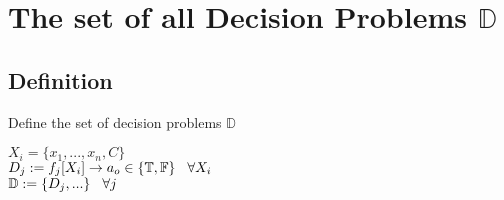 \documentclass[11pt]{article}
\begin{document}
\section{The set of all Decision Problems $\mathbb{D}$}

\subsection{Definition}
Define the set of decision problems $\mathbb{D}$
\begin{center}
$
X_i = \{x_1,...,x_n,C\}
$
\\ \vspace{2mm}
$
D_j := f_j \lbrack X_i \rbrack \rightarrow a_{o} \in \{\mathbb{T}, \mathbb{F}\} \hspace{3mm} \forall X_i
$
\\ \vspace{2mm}
$\mathbb{D} := \{D_j,...\} \hspace{3mm} \forall j$
\end{center}






\end{document}
